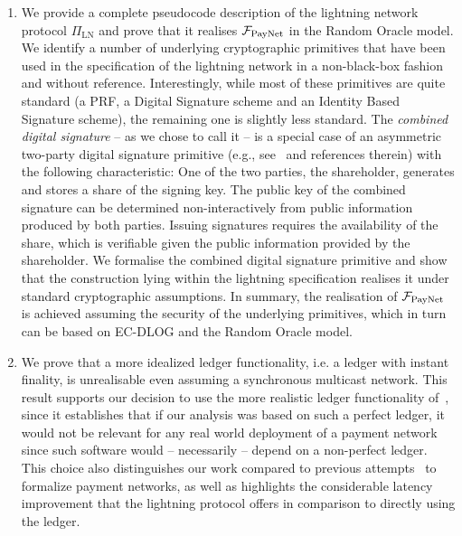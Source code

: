 \begin{enumerate}
\item We provide a complete pseudocode description of the lightning network
protocol $\Pi_{\mathrm{LN}}$ and prove that it realises $\mathcal{F}_{\mathrm{PayNet}}{}$ in the
Random Oracle model. We identify a number of underlying cryptographic primitives
that have been used in the specification of the lightning network in a
non-black-box fashion and without reference. Interestingly, while most of these
primitives are quite standard (a PRF, a Digital Signature scheme and an Identity
Based Signature scheme), the remaining one is slightly less standard. The
\emph{combined digital signature} -- as we chose to call it -- is a special case
of an asymmetric two-party digital signature primitive (e.g.,
see~\cite{DBLP:conf/ndss/NicolosiKDM03} and references therein) with the
following characteristic: One of the two parties, the shareholder, generates and
stores a share of the signing key. The public key of the combined signature can
be determined non-interactively from public information produced by both
parties. Issuing signatures requires the availability of the share, which is
verifiable given the public information provided by the shareholder. We
formalise the combined digital signature primitive and show that the
construction lying within the lightning specification realises it under standard
cryptographic assumptions. In summary, the realisation of $\mathcal{F}_{\mathrm{PayNet}}{}$ is
achieved assuming the security of the underlying primitives, which in turn can
be based on EC-DLOG and the Random Oracle model.

\item We prove that a more idealized ledger functionality, i.e. a ledger with
instant finality, is unrealisable even assuming a synchronous multicast network.
This result supports our decision to use the more realistic ledger functionality
of~\cite{BMTZ17}, since it establishes that if our analysis was based on such a
perfect ledger, it would not be relevant for any real world deployment of a
payment network since such software would -- necessarily -- depend on a
non-perfect ledger. This choice also distinguishes our work compared to previous
attempts~\cite{DBLP:conf/ccs/DziembowskiFH18,Malavolta:2017:CPP:3133956.3134096,sprites,perun}
to formalize payment networks, as well as highlights the considerable latency
improvement that the lightning protocol offers in comparison to directly using
the ledger.
\end{enumerate}

